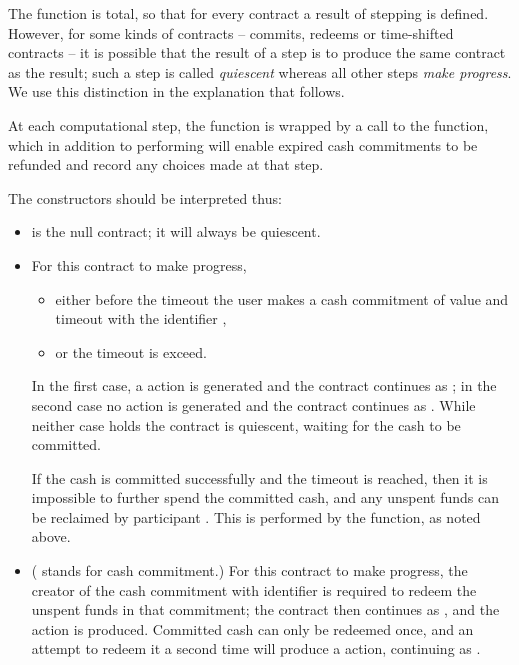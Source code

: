\documentclass[
      acmsmall
    , screen
    , review=true
  ]{acmart}
\begin{document}
The  function is total, so that for every contract a result of stepping is defined. However, for some kinds of contracts -- commits, redeems or time-shifted contracts -- it is possible that the result of a step is to produce the same contract as the result; such a step is called \emph{quiescent} whereas all other steps \emph{make progress}. We use this distinction in the explanation that follows.


At each computational step, the  function is wrapped by a call to the  function, which in addition to performing  will enable expired cash commitments to be refunded and record any choices made at that step.


The constructors should be interpreted thus:

\begin{itemize} 

\item {} is the null contract; it will always be quiescent.

\item {}  For this contract to make progress,\begin{itemize}
\item either before the timeout  the user  makes a cash commitment of value 
 and timeout   with the identifier , 
\item
or the timeout  is exceed.
\end{itemize} 
In the first case, a  action is generated and the contract continues as 
; in the second case no action is generated and the contract continues as 
. While neither case holds the contract is quiescent, waiting for the cash to be committed. 

If the cash is committed successfully and the timeout  is reached, then it is impossible to further spend the committed cash, and any unspent funds can be reclaimed by participant .
 This is performed by the  function, as noted above.

\item {} ( stands for cash commitment.) For this contract to make progress, the creator of the cash commitment with identifier  is required to redeem the unspent funds in that commitment; the contract then continues as , and the action  is produced. 
Committed cash can only be redeemed once, and an attempt to redeem it a second time will produce a   action, continuing as .


\end{itemize}
\end{document}
